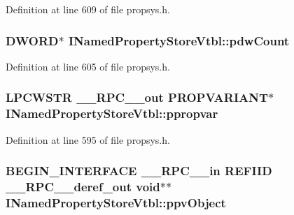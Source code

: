 Definition at line 609 of file propsys.\+h.

\subsubsection[{\texorpdfstring{pdw\+Count}{pdwCount}}]{ {\bf D\+W\+O\+RD}$\ast$ I\+Named\+Property\+Store\+Vtbl\+::pdw\+Count}\hypertarget{struct_i_named_property_store_vtbl_a0c06c7a1c281c20ce41bb5aeb228c519}{}\label{struct_i_named_property_store_vtbl_a0c06c7a1c281c20ce41bb5aeb228c519}


Definition at line 605 of file propsys.\+h.

\subsubsection[{\texorpdfstring{ppropvar}{ppropvar}}]{ {\bf L\+P\+C\+W\+S\+TR} {\bf \+\_\+\+\_\+\+R\+P\+C\+\_\+\+\_\+out} {\bf P\+R\+O\+P\+V\+A\+R\+I\+A\+NT}$\ast$ I\+Named\+Property\+Store\+Vtbl\+::ppropvar}\hypertarget{struct_i_named_property_store_vtbl_a21ce487a54968dbe2d1e42e914e64864}{}\label{struct_i_named_property_store_vtbl_a21ce487a54968dbe2d1e42e914e64864}


Definition at line 595 of file propsys.\+h.

\subsubsection[{\texorpdfstring{ppv\+Object}{ppvObject}}]{\setlength{\rightskip}{0pt plus 5cm}B\+E\+G\+I\+N\+\_\+\+I\+N\+T\+E\+R\+F\+A\+CE {\bf \+\_\+\+\_\+\+R\+P\+C\+\_\+\+\_\+in} {\bf R\+E\+F\+I\+ID} {\bf \+\_\+\+\_\+\+R\+P\+C\+\_\+\+\_\+deref\+\_\+out} {\bf void}$\ast$$\ast$ I\+Named\+Property\+Store\+Vtbl\+::ppv\+Object}\hypertarget{struct_i_named_property_store_vtbl_a1283b9a2967a9497fca4900e2fd0fdb6}{}\label{struct_i_named_property_store_vtbl_a1283b9a2967a9497fca4900e2fd0fdb6}


